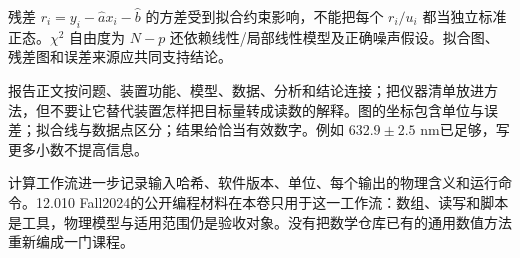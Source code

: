 残差 $r_i=y_i-\hat a x_i-\hat b$ 的方差受到拟合约束影响，不能把每个 $r_i/u_i$ 都当独立标准正态。$\chi^2$ 自由度为 $N-p$ 还依赖线性/局部线性模型及正确噪声假设。拟合图、残差图和误差来源应共同支持结论。

报告正文按问题、装置功能、模型、数据、分析和结论连接；把仪器清单放进方法，但不要让它替代装置怎样把目标量转成读数的解释。图的坐标包含单位与误差；拟合线与数据点区分；结果给恰当有效数字。例如 $632.9\pm2.5$ nm已足够，写更多小数不提高信息。

计算工作流进一步记录输入哈希、软件版本、单位、每个输出的物理含义和运行命令。12.010 Fall2024的公开编程材料在本卷只用于这一工作流：数组、读写和脚本是工具，物理模型与适用范围仍是验收对象。没有把数学仓库已有的通用数值方法重新编成一门课程。
